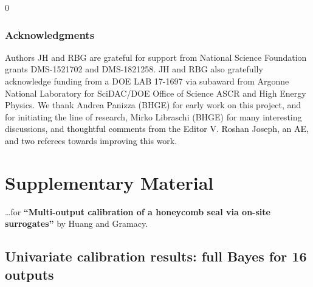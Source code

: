 \documentclass[12pt]{article}
\newcommand{\blu}[1]{\textcolor{black}{#1}} %
\newcommand{\blind}{0}
\begin{document}
\blind{
\subsubsection*{Acknowledgments}

Authors JH and RBG are grateful for support from National Science Foundation
grants DMS-1521702 and DMS-1821258.  JH and RBG also gratefully acknowledge
funding from a DOE LAB 17-1697 via subaward from Argonne National Laboratory
for SciDAC/DOE Office of Science ASCR and High Energy Physics. We thank Andrea
Panizza (BHGE) for early work on this project, and for initiating the line of
research, Mirko Libraschi (BHGE) for many interesting discussions, and
\blu{thoughtful comments from the Editor V. Roshan Joseph, an AE,  and two referees towards improving this work.}

\fi





\pagebreak
\appendix


\section{Supplementary Material}
\label{ap:sep}

\noindent \dots for {\bf ``Multi-output calibration of a honeycomb seal
via on-site surrogates''} by Huang and Gramacy.


\subsection{Univariate calibration results: full Bayes for 16 outputs}
\label{sec:uniap}

}
\end{document}
